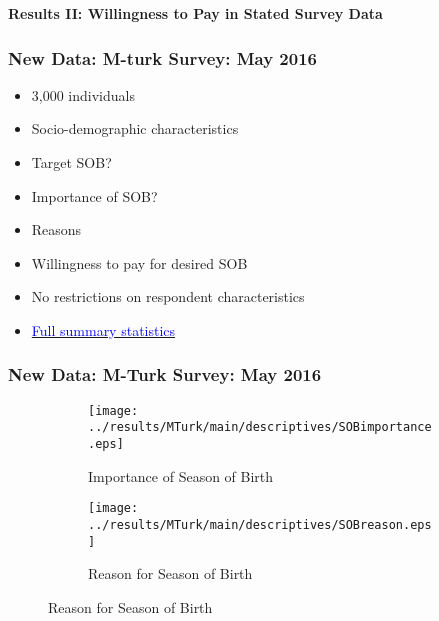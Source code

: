 \documentclass[10pt,letterpaper,subeqn]{beamer}
\begin{document}
\begin{frame}[label=MMain]
  \begin{center}
    \textbf{Results II: Willingness to Pay in Stated Survey Data}
  \end{center}
\end{frame}
\begin{frame}
  \frametitle{New Data: M-turk Survey: May 2016}
  \begin{itemize}
  \item 3,000 individuals
  \item Socio-demographic characteristics
  \item Target SOB?
  \item Importance of SOB?
  \item Reasons
  \item Willingness to pay for desired SOB
  \item No restrictions on respondent characteristics
  \item \hyperlink{MSum}{\textcolor{blue}{Full summary statistics}}   
  \end{itemize}
\end{frame}


\setcounter{figure}{6}
\begin{frame}[label=MTurk]
  \frametitle{New Data: M-Turk Survey: May 2016}
  \begin{figure}[htpb!]
    \begin{center}
      \caption{Descriptive Results}
      \begin{subfigure}{.5\textwidth}
        \centering
        \texttt{[image: ../results/MTurk/main/descriptives/SOBimportance.eps]}
        \caption{Importance of Season of Birth}
        \label{fig:importanceMTurk}
      \end{subfigure}%
      \begin{subfigure}{.5\textwidth}
        \centering
        \texttt{[image: ../results/MTurk/main/descriptives/SOBreason.eps]}
        \caption{Reason for Season of Birth}
        \label{fig:reasonMTurk}
      \end{subfigure}
    \end{center}
  \end{figure}
\end{frame}

\setcounter{figure}{7}
\end{document}
